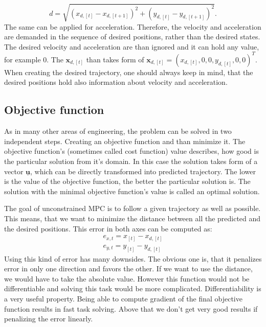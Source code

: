 \documentclass[a4paper,11pt,titlepage]{article}
\begin{document}
\begin{equation}
d = \sqrt{(x_{d,[t]}-x_{d,[t+1]})^2+ (y_{d,[t]}- y_{d,[t+1]})^2}.
\end{equation} 
The same can be applied for acceleration. Therefore, the velocity and acceleration are demanded in the sequence of desired positions, rather than the desired states. The desired velocity and acceleration are than ignored and it can hold any value, for example 0. The $\textbf{x}_{d,[t]}$ than takes form of $\textbf{x}_{d,[t]} = (x_{d,[t]}, 0, 0, y_{d,[t]}, 0, 0)^T$. When creating the desired trajectory, one should always keep in mind, that the desired positions hold also information about velocity and acceleration. 

\subsection{Objective function}
As in many other areas of engineering, the problem can be solved in two independent steps. Creating an objective function and than minimize it. The objective function's (sometimes called cost function) value describes, how good is the particular solution from it's domain. In this case the solution takes form of a vector $\underline{\textbf{u}}$, which can be directly transformed into predicted trajectory. The lower is the value of the objective function, the better the particular solution is. The solution with the minimal objective function's value is called an optimal solution.

The goal of unconstrained MPC is to follow a given trajectory as well as possible. This means, that we want to minimize the distance between all the predicted and the desired positions. This error in both axes can be computed as:
\begin{equation}
\begin{split}
\label{eq:simple_err}
e_{x, t} = x_{[t]} - x_{d, [t]}\\
e_{y, t} = y_{[t]} - y_{d, [t]}
\end{split}
\end{equation}
Using this kind of error has many downsides. The obvious one is, that it penalizes error in only one direction and favors the other. If we want to use the distance, we would have to take the absolute value. However this function would not be differentiable \cite{stein1970singular} and solving this task would be more complicated. Differentiability is a very useful property. Being able to compute gradient of the final objective function results in fast task solving. Above that we don't get very good results if penalizing the error linearly. 
\end{document}
